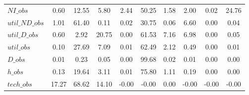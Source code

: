 \begin{center}
\begin{longtable}{lccccccccc}
$NI\_obs        $	 & 	         0.60	 & 	        12.55	 & 	         5.80	 & 	         2.44	 & 	        50.25	 & 	         1.58	 & 	         2.00	 & 	         0.02	 & 	        24.76 \\ 
$util\_ND\_obs  $	 & 	         1.01	 & 	        61.40	 & 	         0.11	 & 	         0.02	 & 	        30.75	 & 	         0.06	 & 	         6.60	 & 	         0.00	 & 	         0.04 \\ 
$util\_D\_obs   $	 & 	         0.60	 & 	         2.92	 & 	        20.75	 & 	         0.00	 & 	        61.53	 & 	         7.16	 & 	         6.98	 & 	         0.00	 & 	         0.05 \\ 
$util\_obs      $	 & 	         0.10	 & 	        27.69	 & 	         7.09	 & 	         0.01	 & 	        62.49	 & 	         2.12	 & 	         0.49	 & 	         0.00	 & 	         0.01 \\ 
$D\_obs         $	 & 	         0.01	 & 	         0.23	 & 	         0.05	 & 	         0.00	 & 	        99.68	 & 	         0.02	 & 	         0.01	 & 	         0.00	 & 	         0.00 \\ 
$h\_obs         $	 & 	         0.13	 & 	        19.64	 & 	         3.11	 & 	         0.01	 & 	        75.80	 & 	         1.11	 & 	         0.19	 & 	         0.00	 & 	         0.00 \\ 
$tech\_obs      $	 & 	        17.27	 & 	        68.62	 & 	        14.10	 & 	        -0.00	 & 	        -0.00	 & 	         0.00	 & 	        -0.00	 & 	        -0.00	 & 	        -0.00 \\ 
\end{longtable}
 \end{center}
